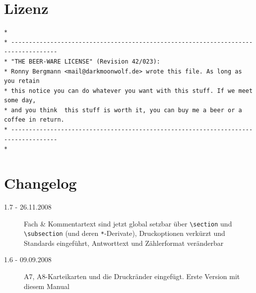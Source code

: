 \documentclass[a4paper]{article}
\begin{document}
\section{Lizenz}
\begin{lstlisting}[basicstyle=\footnotesize\sffamily, numbers=none]
*
* -----------------------------------------------------------------------------------
* "THE BEER-WARE LICENSE" (Revision 42/023):
* Ronny Bergmann <mail@darkmoonwolf.de> wrote this file. As long as you retain 
* this notice you can do whatever you want with this stuff. If we meet some day,
* and you think  this stuff is worth it, you can buy me a beer or a coffee in return. 
* -----------------------------------------------------------------------------------
*
\end{lstlisting}

\section{Changelog}
\begin{description}
	\item[1.7 - 26.11.2008] Fach \& Kommentartext sind jetzt global setzbar über \lstinline!\section! und \lstinline!\subsection! (und deren \lstinline!*!-Derivate), Druckoptionen verkürzt und Standards eingeführt, Antworttext und Zählerformat veränderbar
	\item[1.6 - 09.09.2008] A7, A8-Karteikarten und die Druckränder eingefügt. Erste Version mit diesem Manual
\end{description}
\end{document}
